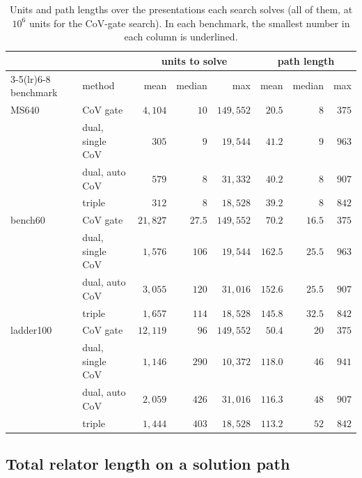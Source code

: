 \documentclass[11pt]{article}
\theoremstyle{definition}
\theoremstyle{remark}
\begin{document}
\begin{table}[ht]
\centering
\small
\begin{tabular}{llrrrrrr}
\toprule
& & \multicolumn{3}{c}{units to solve} & \multicolumn{3}{c}{path length}\\
\cmidrule(lr){3-5}\cmidrule(lr){6-8}
benchmark & method & mean & median & max & mean & median & max\\
\midrule
MS640 & CoV gate & $4{,}104$ & $10$ & $149{,}552$ & \underline{$20.5$} & \underline{$8$} & \underline{$375$}\\
& dual, single CoV & \underline{$305$} & $9$ & $19{,}544$ & $41.2$ & $9$ & $963$\\
& dual, auto CoV & $579$ & \underline{$8$} & $31{,}332$ & $40.2$ & \underline{$8$} & $907$\\
& triple & $312$ & \underline{$8$} & \underline{$18{,}528$} & $39.2$ & \underline{$8$} & $842$\\
\midrule
bench60 & CoV gate & $21{,}827$ & \underline{$27.5$} & $149{,}552$ & \underline{$70.2$} & \underline{$16.5$} & \underline{$375$}\\
& dual, single CoV & \underline{$1{,}576$} & $106$ & $19{,}544$ & $162.5$ & $25.5$ & $963$\\
& dual, auto CoV & $3{,}055$ & $120$ & $31{,}016$ & $152.6$ & $25.5$ & $907$\\
& triple & $1{,}657$ & $114$ & \underline{$18{,}528$} & $145.8$ & $32.5$ & $842$\\
\midrule
ladder100 & CoV gate & $12{,}119$ & \underline{$96$} & $149{,}552$ & \underline{$50.4$} & \underline{$20$} & \underline{$375$}\\
& dual, single CoV & \underline{$1{,}146$} & $290$ & \underline{$10{,}372$} & $118.0$ & $46$ & $941$\\
& dual, auto CoV & $2{,}059$ & $426$ & $31{,}016$ & $116.3$ & $48$ & $907$\\
& triple & $1{,}444$ & $403$ & $18{,}528$ & $113.2$ & $52$ & $842$\\
\bottomrule
\end{tabular}
\caption{Units and path lengths over the presentations each search solves (all of them, at $10^6$ units for the
CoV-gate search). In each benchmark, the smallest number in each column is underlined.}
\label{tab:cov_search_paths}
\end{table}

\FloatBarrier
\subsection{Total relator length on a solution path}\label{sec:maxrel}
\end{document}
